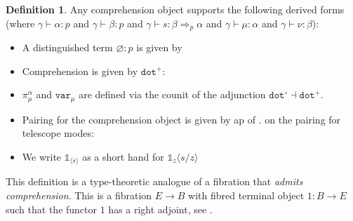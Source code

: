 \documentclass[10pt]{article}
\theoremstyle{definition}
\newtheorem{definition}{Definition}
\let\emptyset\varnothing
\newcommand\dsd[1]{\ensuremath{\mathsf{#1}}}
\newcommand{\yields}{\vdash}
\newcommand{\tcell}{\Rightarrow}
\newcommand{\app}[2]{\ensuremath{#1 \: #2}}
\newcommand{\fst}[1]{\app{\dsd{fst}}{#1}}
\newcommand{\snd}[1]{\app{\dsd{snd}}{#1}}
\newcommand\TermTwoT[5]{\ensuremath{#1 \vdash {#2} : #3 \tcell_{#5} #4}}
\newcommand\TrPlus[2]{\ensuremath{{#1}^+(#2)}}
\newcommand\El[2]{\mathcal{T}_{#1}(#2)}
\newcommand\ApEl[2]{\mathcal{T}_{#1}\langle#2\rangle}
\newcommand\bdot[0]{\mathbin{.}}
\newcommand\ap[2]{\ensuremath{#1 \langle #2 \rangle }}
\newcommand\ApPlus[2]{\ensuremath{{#1}^+ \langle #2 \rangle }}
\newcommand{\tdot}{\ensuremath{\mathtt{dot}}}
\newcommand{\tempty}{\ensuremath{\mathtt{empty}}}
\newcommand\One{\ensuremath{\mathds{1}}}
\newcommand\var[1]{\ensuremath{\mathtt{var}_{#1}}}
\newcommand\ApOne[1]{\ensuremath{\One_{\langle {#1} \rangle }}}
\begin{document}
\begin{definition}
Any comprehension object supports the following derived forms (where $\gamma \yields \alpha : p$
and $\gamma \yields \beta : p$ and
$\TermTwoT{\gamma}{s}{\beta}{\alpha}{p}$ and $\gamma \yields \mu :
\alpha$ and $\gamma \yields \nu : \beta$):
  \begin{itemize}
  \item A distinguished term $\emptyset : p$ is given by
  \item Comprehension is given by $\tdot^+$:
  \item $\pi^\alpha_\mu$ and $\var{\mu}$ are defined via the counit of the adjunction $\tdot^\circ \dashv \tdot^+$.
  \item Pairing for the comprehension object is given by ap of
  $.$ on the pairing for telescope modes:
  \item We write $\ApOne{s}$ as a short hand for $\ap{\One_z}{s/z}$
  \end{itemize}
\end{definition}

This definition is a type-theoretic analogue of a fibration that \emph{admits comprehension}. This is a fibration $E \to B$ with fibred terminal object $1 : B \to E$ such that the functor $1$ has a right adjoint, see .
\end{document}

